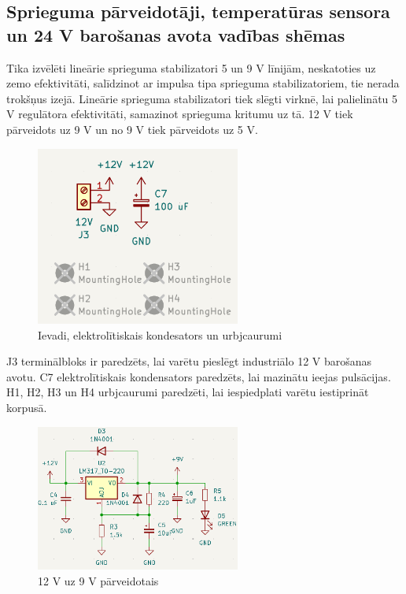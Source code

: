 \subsection{Sprieguma pārveidotāji, temperatūras sensora un 24 V barošanas avota vadības shēmas}
Tika izvēlēti lineārie sprieguma stabilizatori 5 un 9 V līnijām, neskatoties uz zemo efektivitāti, salīdzinot ar impulsa tipa sprieguma stabilizatoriem, tie nerada trokšņus izejā. Lineārie sprieguma stabilizatori tiek slēgti virknē, lai palielinātu 5 V regulātora efektivitāti, samazinot sprieguma kritumu uz tā. 12 V tiek pārveidots uz 9 V un no 9 V tiek pārveidots uz 5 V.  
\begin{figure}[H]
	\centering
    \includegraphics[width=0.6\textwidth]{pictures/inputs.png}\hspace{1cm}
    \caption{Ievadi, elektrolītiskais kondesators un urbjcaurumi}
\end{figure}
J3 terminālbloks ir paredzēts, lai varētu pieslēgt industriālo 12 V barošanas avotu. C7 elektrolītiskais kondensators paredzēts, lai mazinātu ieejas pulsācijas. H1, H2, H3 un H4 urbjcaurumi paredzēti, lai iespiedplati varētu iestiprināt korpusā.
\begin{figure}[H]
	\centering
    \includegraphics[width=0.6\textwidth]{pictures/9v.png}\hspace{1cm}
    \caption{12 V uz 9 V pārveidotais}
\end{figure}
